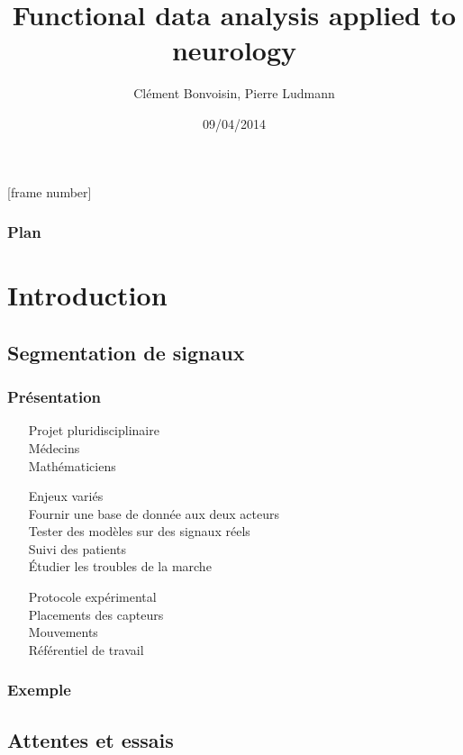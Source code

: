 \documentclass{beamer}
\title[Signal segmentation]{Functional data analysis applied to neurology}
\author{Clément Bonvoisin, Pierre Ludmann}
\institute{CMLA (ENS Cachan), Cognac-G (Paris V)}
\date{09/04/2014}
\begin{document}
[frame number]

\begin{frame}
\titlepage
\end{frame}

\begin{frame}
\frametitle{Plan}
  \tableofcontents[hideallsubsections]
\end{frame}


\section{Introduction}
\subsection{Segmentation de signaux}
\begin{frame}
	\frametitle{Présentation}
	\begin{itemize}
		\item[Projet] pluridisciplinaire
			\\ Médecins
			\\ Mathématiciens
		\item[Enjeux] variés
			\\ Fournir une base de donnée aux deux acteurs
			\\ Tester des modèles sur des signaux réels
			\\ Suivi des patients
			\\ Étudier les troubles de la marche
		\item[Protocole] expérimental
			\\ Placements des capteurs
			\\ Mouvements
			\\ Référentiel de travail
	\end{itemize}	
\end{frame}

\begin{frame}
	\frametitle{Exemple}
\end{frame}
\subsection{Attentes et essais}
\end{document}
